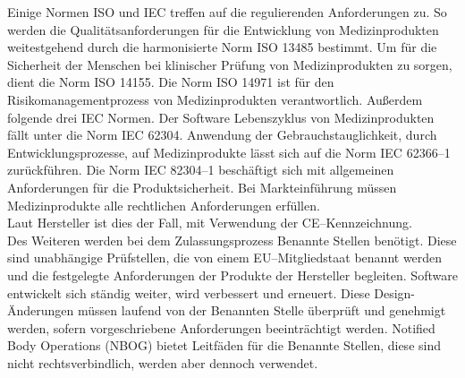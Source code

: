 Einige Normen ISO und IEC treffen auf die regulierenden Anforderungen zu.
So werden die Qualitätsanforderungen für die Entwicklung von Medizinprodukten weitestgehend durch die harmonisierte Norm ISO 13485 bestimmt. 
Um für die Sicherheit der Menschen bei klinischer Prüfung von Medizinprodukten zu sorgen, dient die Norm ISO 14155.
Die Norm ISO 14971 ist für den Risikomanagementprozess von Medizinprodukten verantwortlich.
Außerdem folgende drei IEC Normen.
Der Software Lebenszyklus von Medizinprodukten fällt unter die Norm IEC 62304. 
Anwendung der Gebrauchstauglichkeit, durch Entwicklungsprozesse,
auf Medizinprodukte lässt sich auf die Norm IEC 62366--1 zurückführen. 
Die Norm IEC 82304--1 beschäftigt sich mit allgemeinen Anforderungen für die Produktsicherheit.
Bei Markteinführung müssen Medizinprodukte alle rechtlichen Anforderungen erfüllen.\\ 
Laut Hersteller ist dies der Fall, mit Verwendung der CE--Kennzeichnung.\cite{AI_in_EU}\\
Des Weiteren werden bei dem Zulassungsprozess Benannte Stellen benötigt. 
Diese sind unabhängige Prüfstellen, die von einem EU--Mitgliedstaat benannt werden und die festgelegte Anforderungen der Produkte der Hersteller begleiten. Software entwickelt sich ständig weiter, 
wird verbessert und erneuert. 
Diese Design-Änderungen müssen laufend von der Benannten Stelle überprüft und genehmigt werden, sofern vorgeschriebene Anforderungen beeinträchtigt werden. 
Notified Body Operations (NBOG) bietet Leitfäden für die Benannte Stellen, diese sind nicht rechtsverbindlich, werden aber dennoch verwendet.\cite{AI_in_EU}
